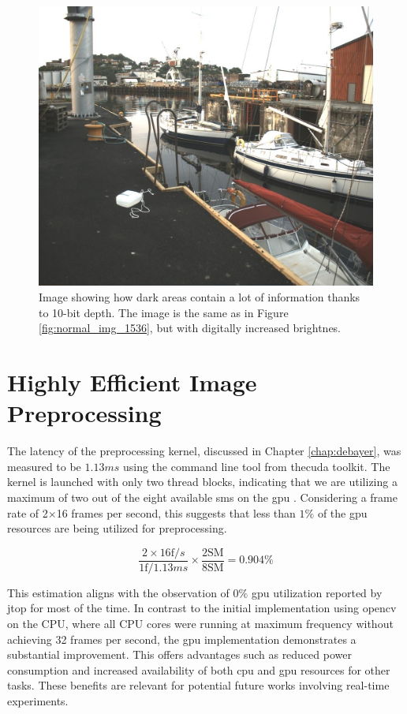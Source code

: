 \begin{figure}[H]
    \centering
    \includegraphics[width=.8\textwidth]{figures/pictures/gained_right_96.jpeg}
    \caption{Image showing how dark areas contain a lot of information thanks to 10-bit depth.
        The image is the same as in Figure \ref{fig:normal_img_1536}, but with digitally increased brightnes.}
    \label{fig:gained_image}
\end{figure}


\section{Highly Efficient Image Preprocessing}

The latency of the preprocessing kernel, discussed in Chapter \ref{chap:debayer}, was measured to be $1.13ms$ using the  command line tool from the\gls{cuda} toolkit.
The kernel is launched with only two thread blocks, indicating that we are utilizing a maximum of two out of the eight available \glspl{sm} on the \gls{gpu} \cite{rigerunNVIDIAJetsonXavier2023}.
Considering a frame rate of 2$\times$16 frames per second, this suggests that less than $1\%$ of the \gls{gpu} resources are being utilized for preprocessing.

\begin{equation}
    \frac{2 \times 16 \text{f}/s}{1 \text{f} / 1.13ms} \times \frac{2 \text{SM}}{8 \text{SM}} = 0.904\%
\end{equation}

This estimation aligns with the observation of $0\%$ \gls{gpu} utilization reported by \gls{jtop} for most of the time.
In contrast to the initial implementation using \gls{opencv} on the CPU, where all CPU cores were running at maximum frequency without achieving 32 frames per second, the \gls{gpu} implementation demonstrates a substantial improvement.
This offers advantages such as reduced power consumption and increased availability of both \gls{cpu} and \gls{gpu} resources for other tasks.
These benefits are relevant for potential future works involving real-time experiments.


